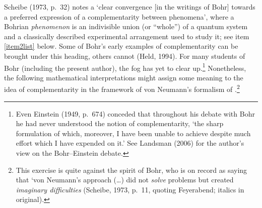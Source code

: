 \documentclass[12pt]{article}
\begin{document}
Scheibe (1973, p.\ 32) notes a `clear convergence [in the writings of Bohr] towards a preferred expression of a complementarity between phenomena', where a Bohrian {\it phenomenon} is an indivisible union (or ``whole'') of a quantum system and a classically described experimental arrangement used to study it; see item \ref{item2list} below. Some of Bohr's early examples of 
complementarity can be brought under this heading, others  cannot (Held, 1994). For many students of Bohr (including the present author), the fog has yet to clear up.\footnote{Even Einstein (1949, p.\ 674) conceded that throughout his debate with Bohr he had never understood the notion of complementarity, `the sharp formulation of which, moreover, 
 I have been unable to achieve despite much effort which I have expended on it.' See Landsman (2006) for the author's view on the Bohr--Einstein debate. }
 Nonetheless, the following mathematical interpretations might assign some meaning to the idea of complementarity in the framework of von Neumann's formalism of \qm.\footnote{This exercise is quite against the spirit of Bohr, who is on record as saying that `von Neumann's approach (\ldots) did not {\it solve} problems but created {\it imaginary difficulties} (Scheibe, 1973, p.\ 11, quoting Feyerabend; italics in original).} 
\end{document}
